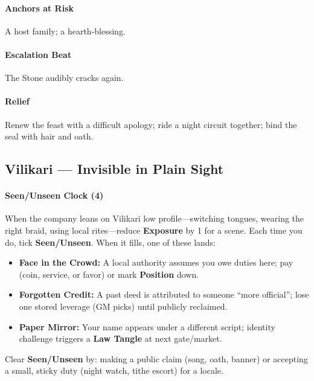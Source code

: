 \paragraph{Anchors at Risk} A host family; a hearth-blessing.
\paragraph{Escalation Beat} The Stone audibly cracks again.
\paragraph{Relief} Renew the feast with a difficult apology; ride a night circuit together; bind the seal with hair and oath.

\subsection*{Vilikari — Invisible in Plain Sight}
\paragraph{Seen/Unseen Clock (4)} When the company leans on Vilikari low profile—switching tongues, wearing the right braid, using local rites—reduce \textbf{Exposure} by 1 for a scene. Each time you do, tick \textbf{Seen/Unseen}. When it fills, one of these lands:
\begin{itemize}
  \item \textbf{Face in the Crowd:} A local authority assumes you owe duties here; pay (coin, service, or favor) or mark \textbf{Position} down.
  \item \textbf{Forgotten Credit:} A past deed is attributed to someone “more official”; lose one stored leverage (GM picks) until publicly reclaimed.
  \item \textbf{Paper Mirror:} Your name appears under a different script; identity challenge triggers a \textbf{Law Tangle} at next gate/market.
\end{itemize}
Clear \textbf{Seen/Unseen} by: making a public claim (song, oath, banner) or accepting a small, sticky duty (night watch, tithe escort) for a locale.

\medskip

